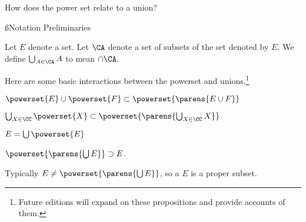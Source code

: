 

How does the power set relate to a union?

\ss{Notation Preliminaries}

Let $E$ denote a set.
Let $\CA$ denote a set of subsets of the set denoted by $E$.
We define $\bigcup_{A \in \CA} A$ to mean $\cap \CA$.


Here are some basic interactions between the powerset and unions.\footnote{Future editions will expand on these propositions and provide accounts of them.}

\begin{proposition}
$\powerset{E} \cup \powerset{F} \subset \powerset{\parens{E \cup F}}$
\end{proposition}

\begin{proposition}
$\bigcup_{X \in \CC} \powerset{X} \subset \powerset{\parens{\bigcup_{X \in \CC} X}}$
\end{proposition}

\begin{proposition}
  $E = \bigcup \powerset{E}$
\end{proposition}

\begin{proposition}
  $\powerset{\parens{\bigcup E}} \supset E$.
\end{proposition}
Typically $E \neq \powerset{\parens{\bigcup E}}$, so a $E$ is a proper subset.

\blankpage
